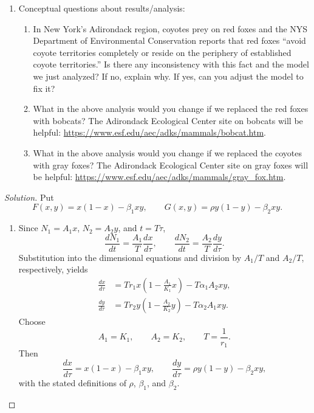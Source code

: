 \documentclass[12pt]{amsart}
\theoremstyle{conjecture}
\theoremstyle{definition}
\theoremstyle{question}
\theoremstyle{theorem}
\newenvironment{solution}
{\begin{proof}[Solution]}
{\end{proof}}
\begin{document}
\begin{enumerate}[leftmargin=2em]
\begin{enumerate}[label=(\alph*),leftmargin=2.2em]
        \item Conceptual questions about results/analysis:
            \begin{enumerate}[label=\roman*.,leftmargin=2em]
                \item In New York's Adirondack region, coyotes prey on red foxes and the
                NYS Department of Environmental Conservation reports that red foxes
                ``avoid coyote territories completely or reside on the periphery of
                established coyote territories.'' Is there any inconsistency with
                this fact and the model we just analyzed? If no, explain why. If yes,
                can you adjust the model to fix it?
                \item What in the above analysis would you change if we replaced the red
                foxes with bobcats? The Adirondack Ecological Center site on bobcats
                will be helpful:
                \url{https://www.esf.edu/aec/adks/mammals/bobcat.htm}.
                \item What in the above analysis would you change if we replaced the
                coyotes with gray foxes? The Adirondack Ecological Center site on gray
                foxes will be helpful:
                \url{https://www.esf.edu/aec/adks/mammals/gray_fox.htm}.
            \end{enumerate}
        \end{enumerate}

      \begin{solution}
          Put
          \[
              F(x,y)=x(1-x)-\beta_1xy,
              \qquad
              G(x,y)=\rho y(1-y)-\beta_2xy.
          \]

          \begin{enumerate}[label=(\alph*),leftmargin=2.2em]
          \item Since $N_1=A_1x$, $N_2=A_2y$, and $t=T\tau$,
          \[
              \frac{dN_1}{dt}=\frac{A_1}{T}\frac{dx}{d\tau},
              \qquad
              \frac{dN_2}{dt}=\frac{A_2}{T}\frac{dy}{d\tau}.
          \]
          Substitution into the dimensional equations and division by $A_1/T$
          and $A_2/T$, respectively, yields
          \begin{align*}
              \frac{dx}{d\tau}
              &=Tr_1x\left(1-\frac{A_1}{K_1}x\right)
              -T\alpha_1A_2xy,\\
              \frac{dy}{d\tau}
              &=Tr_2y\left(1-\frac{A_2}{K_2}y\right)
              -T\alpha_2A_1xy.
          \end{align*}
          Choose
          \[
              A_1=K_1,\qquad A_2=K_2,
              \qquad T=\frac1{r_1}.
          \]
          Then
          \[
              \frac{dx}{d\tau}=x(1-x)-\beta_1xy,
              \qquad
              \frac{dy}{d\tau}=\rho y(1-y)-\beta_2xy,
          \]
          with the stated definitions of $\rho$, $\beta_1$, and $\beta_2$.


\end{enumerate}
\end{solution}
\end{enumerate}
\end{document}
